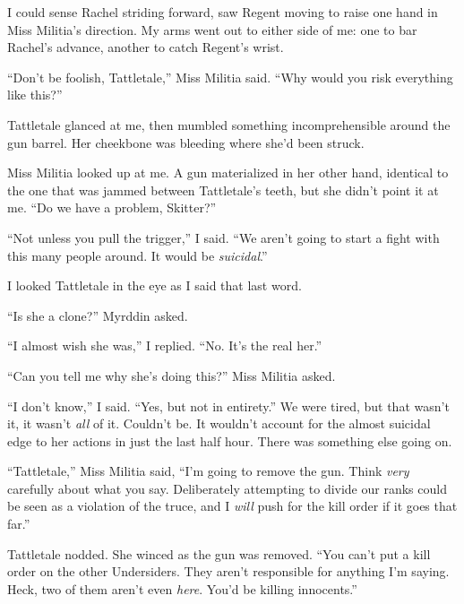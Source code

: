 I could sense Rachel striding forward, saw Regent moving to raise one hand in Miss Militia's direction.  My arms went out to either side of me: one to bar Rachel's advance, another to catch Regent's wrist.



``Don't be foolish, Tattletale,'' Miss Militia said.  ``Why would you risk everything like this?''



Tattletale glanced at me, then mumbled something incomprehensible around the gun barrel.  Her cheekbone was bleeding where she'd been struck.



Miss Militia looked up at me.  A gun materialized in her other hand, identical to the one that was jammed between Tattletale's teeth, but she didn't point it at me.  ``Do we have a problem, Skitter?''



``Not unless you pull the trigger,'' I said.  ``We aren't going to start a fight with this many people around.  It would be \emph{suicidal}.''



I looked Tattletale in the eye as I said that last word.



``Is she a clone?'' Myrddin asked.



``I almost wish she was,'' I replied.  ``No.  It's the real her.''



``Can you tell me why she's doing this?'' Miss Militia asked.



``I don't know,'' I said.  ``Yes, but not in entirety.''  We were tired, but that wasn't it, it wasn't \emph{all} of it.  Couldn't be.  It wouldn't account for the almost suicidal edge to her actions in just the last half hour.  There was something else going on.



``Tattletale,'' Miss Militia said, ``I'm going to remove the gun.  Think \emph{very} carefully about what you say.  Deliberately attempting to divide our ranks could be seen as a violation of the truce, and I \emph{will} push for the kill order if it goes that far.''



Tattletale nodded.  She winced as the gun was removed.  ``You can't put a kill order on the other Undersiders.  They aren't responsible for anything I'm saying.  Heck, two of them aren't even \emph{here}.  You'd be killing innocents.''



